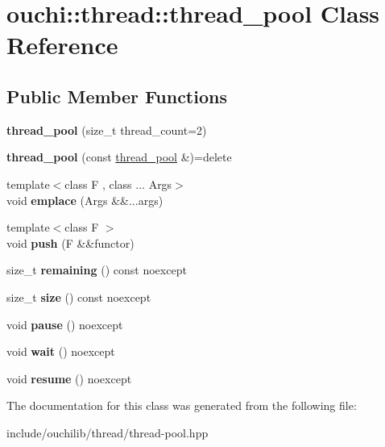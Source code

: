 \hypertarget{classouchi_1_1thread_1_1thread__pool}{}\section{ouchi\+::thread\+::thread\+\_\+pool Class Reference}
\label{classouchi_1_1thread_1_1thread__pool}
\subsection*{Public Member Functions}
\begin{DoxyCompactItemize}
\item 
\mbox{\label{classouchi_1_1thread_1_1thread__pool_ad21a9a002c319d79d7319aea6931eb2b}} 
{\bfseries thread\+\_\+pool} (size\+\_\+t thread\+\_\+count=2)
\item 
\mbox{\label{classouchi_1_1thread_1_1thread__pool_a0a46e547d0ad062a20df267757cb72cf}} 
{\bfseries thread\+\_\+pool} (const \mbox{\hyperlink{classouchi_1_1thread_1_1thread__pool}{thread\+\_\+pool}} \&)=delete
\item 
\mbox{\label{classouchi_1_1thread_1_1thread__pool_adebd814ecd10301afabacc25f53dc396}} 
{\footnotesize template$<$class F , class ... Args$>$ }\\void {\bfseries emplace} (Args \&\&...args)
\item 
\mbox{\label{classouchi_1_1thread_1_1thread__pool_ad57b3dea8495007e8af6e174f96b1b36}} 
{\footnotesize template$<$class F $>$ }\\void {\bfseries push} (F \&\&functor)
\item 
\mbox{\label{classouchi_1_1thread_1_1thread__pool_a1eb0dc198846dbe012a158ba1e6c3ef5}} 
size\+\_\+t {\bfseries remaining} () const noexcept
\item 
\mbox{\label{classouchi_1_1thread_1_1thread__pool_a24d333c499424e25f9ea0e70bbde37f5}} 
size\+\_\+t {\bfseries size} () const noexcept
\item 
\mbox{\label{classouchi_1_1thread_1_1thread__pool_ac9d4e99986bb1859940323303f19bb51}} 
void {\bfseries pause} () noexcept
\item 
\mbox{\label{classouchi_1_1thread_1_1thread__pool_ae19c5530bd449095095a80e01d4d766a}} 
void {\bfseries wait} () noexcept
\item 
\mbox{\label{classouchi_1_1thread_1_1thread__pool_a3d0640597b765a047c5a0232d299dadf}} 
void {\bfseries resume} () noexcept
\end{DoxyCompactItemize}


The documentation for this class was generated from the following file\+:\begin{DoxyCompactItemize}
\item 
include/ouchilib/thread/thread-\/pool.\+hpp\end{DoxyCompactItemize}
